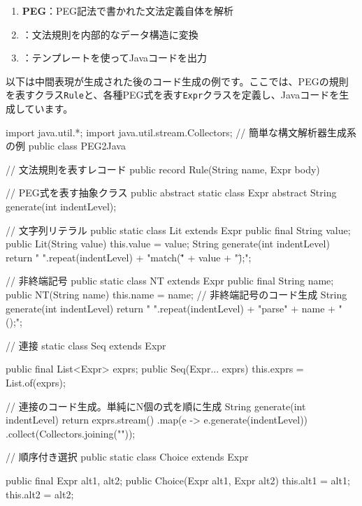 \begin{enumerate}
\item
  \textbf{\sffamily PEG}：PEG記法で書かれた文法定義自体を解析
\item
  ：文法規則を内部的なデータ構造に変換
\item
  ：テンプレートを使ってJavaコードを出力
\end{enumerate}

以下は中間表現が生成された後のコード生成の例です。ここでは、PEGの規則を表すクラス\texttt{Rule}と、各種PEG式を表す\texttt{Expr}クラスを定義し、Javaコードを生成しています。

\begin{codescreen}{}
import java.util.*;
import java.util.stream.Collectors;
// 簡単な構文解析器生成系の例
public class PEG2Java {
    // 文法規則を表すレコード
    public record Rule(String name, Expr body) {}
    
    // PEG式を表す抽象クラス
    public abstract static class Expr {
        abstract String generate(int indentLevel);
    }
    
    // 文字列リテラル
    public static class Lit extends Expr {
        public final String value;
        public Lit(String value) {
            this.value = value;
        }
        String generate(int indentLevel) {
            return " ".repeat(indentLevel) + "match(\"" + value + "\");";
        }
    }

    // 非終端記号
    public static class NT extends Expr {
        public final String name;
        public NT(String name) {
            this.name = name;
        }
        // 非終端記号のコード生成
        String generate(int indentLevel) {
            return " ".repeat(indentLevel) + "parse" + name + "();";
        }
    }
    
    // 連接
    static class Seq extends Expr {
        public final List<Expr> exprs;
        public Seq(Expr... exprs) {
            this.exprs = List.of(exprs);
        }

        // 連接のコード生成。単純にN個の式を順に生成
        String generate(int indentLevel) {
            return exprs.stream()
                .map(e -> e.generate(indentLevel))
                .collect(Collectors.joining("\n"));
        }
    }

    // 順序付き選択
    public static class Choice extends Expr {
        public final Expr alt1, alt2;
        public Choice(Expr alt1, Expr alt2) {
            this.alt1 = alt1;
            this.alt2 = alt2;
        }

}}
\end{codescreen}
